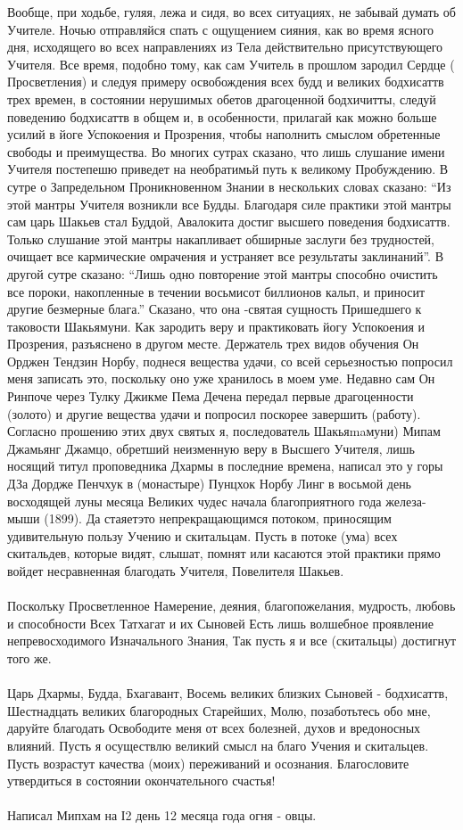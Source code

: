Вообще, при ходьбе, гуляя, лежа и сидя, во всех ситуациях, не забывай думать об Учителе.
Ночью отправляйся спать с ощущением сияния, как во время ясного дня, исходящего
во всех направлениях из Тела действительно присутствующего Учителя. Все время,
подобно тому, как сам Учитель в прошлом зародил Сердце ( Просветления) и следуя
примеру освобождения всех будд и великих бодхисаттв трех времен, в состоянии
нерушимых обетов драгоценной бодхичитты, следуй поведению бодхисаттв в общем и,
в особенности, прилагай как можно больше усилий в йоге Успокоения и Прозрения,
чтобы наполнить смыслом обретенные свободы и преимущества.
Во многих сутрах сказано, что лишь слушание имени Учителя постепешю приведет
на необратимьй путь к великому Пробуждению. В сутре о Запредельном Проникновенном
Знании в нескольких словах сказано:
“Из этой мантры Учителя возникли все Будды. Благодаря силе практики этой мантры
сам царь Шакьев стал Буддой, Авалокита достиг высшего поведения бодхисаттв.
Только слушание этой мантры накапливает обширные заслуги без трудностей,
очищает все кармические омрачения и устраняет все результаты заклинаний”.
В другой сутре сказано: “Лишь одно повторение этой мантры способно очистить
все пороки, накопленные в течении восьмисот биллионов кальп, и приносит другие
безмерные блага.” Сказано, что она -святая сущность Пришедшего к таковости Шакьямуни.
Как зародить веру и практиковать йогу Успокоения и Прозрения, разъяснено в другом месте.
Держатель трех видов обучения Он Орджен Тендзин Норбу, поднеся вещества удачи,
со всей серьезностью попросил меня записать это, поскольку оно уже хранилось
в моем уме. Недавно сам Он Ринпоче через Тулку Джикме Пема Дечена передал
первые драгоценности (золото) и другие вещества удачи и попросил поскорее
завершить (работу). Согласно прошению этих двух святых я, последователь
Шакьяmaмуни) Мипам Джамьянг Джамцо, обретший неизменную веру в Высшего
Учителя, лишь носящий титул проповедника Дхармы в последние времена,
написал это у горы ДЗа Дордже Пенчхук в (монастыре) Пунцхок Норбу Линг
в восьмой день восходящей луны месяца Великих чудес начала благоприятного
года железа-мыши (1899). Да стаяетэто непрекращающимся потоком, приносящим
удивительную пользу Учению и скитальцам. Пусть в потоке (ума) всех скитальдев,
которые видят, слышат, помнят или касаются этой практики прямо войдет несравненная
благодать Учителя, Повелителя Шакьев.\\
\\
Посколъку Просветленное Намерение, деяния, благопожелания, мудрость, любовь и способности
Всех Татхагат и их Сыновей
Есть лишь волшебное проявление непревосходимого Изначального Знания,
Так пусть я и все (скитальцы) достигнут того же.\\
\\
Царь Дхармы, Будда, Бхагавант,
Восемь великих близких Сыновей - бодхисаттв,
Шестнадцать великих благородных Старейших,
Молю, позаботьтесь обо мне, даруйте благодать
Освободите меня от всех болезней, духов и вредоносных влияний.
Пусть я осуществлю великий смысл на благо Учения и скитальцев.
Пусть возрастут качества (моих) переживаний и осознания.
Благословите утвердиться в состоянии окончательного счастья!\\
\\
Написал Мипхам на І2 день 12 месяца года огня - овцы.
\footnotesize